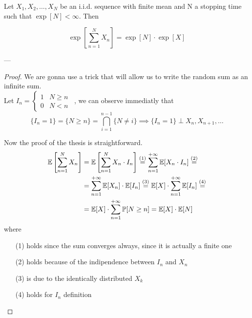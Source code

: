 \begin{theorem}
	Let $X_1, X_2, \dots, X_N $ be an i.i.d. sequence with finite mean and N a stopping time such that $\exp[N] < \infty$. Then

	\begin{equation}
		\exp\left[\sum\limits_{n=1}^N X_n \right] = \exp[N] \cdot \exp[X]
	\end{equation}
\end{theorem}
---
\begin{proof}
	We are gonna use a trick that will allow us to write the random sum as an infinite sum. \\

	Let $I_n = \begin{cases} 1 & N \ge n \\ 0 & N<n \end{cases}$~, we can observe immediatly that
	$$ \{I_n=1\} = \{N \ge n \} = \bigcap\limits_{i=1}^{n-1}\{ N \neq i \} \implies \{I_n=1\} \perp X_n, X_{n+1}, \ldots $$

	Now the proof of the thesis is straightforward.
	\begin{equation}\begin{split}
		\mathbb{E}\left[\sum\limits_{n=1}^{N}X_n\right] &= \mathbb{E}\left[\sum\limits_{n=1}^{N}X_n \cdot I_n \right] \stackrel{(1)}{=} \sum\limits_{n=1}^{+\infty}\mathbb{E}[X_n \cdot I_n] \stackrel{(2)}{=} \\
		&=\sum\limits_{n=1}^{+\infty}\mathbb{E}[X_n] \cdot \mathbb{E}[I_n] \stackrel{(3)}{=} \mathbb{E}[X]\cdot\sum\limits_{n=1}^{+\infty}\mathbb{E}[I_n] \stackrel{(4)}{=} \\
		&= \mathbb{E}[X] \cdot \sum\limits_{n=1}^{+\infty}\mathbb{P}[N \ge n] = \mathbb{E}[X] \cdot \mathbb{E}[N]
	\end{split}\end{equation}
	where
	\begin{itemize}
		\item[(1)] holds since the sum converges always, since it is actually a finite one
		\item[(2)] holds because of the indipendence between $I_n$ and $X_n$
		\item[(3)] is due to the identically distributed $X_k$
		\item[(4)] holds for $I_n$ definition
	\end{itemize}
\end{proof}

